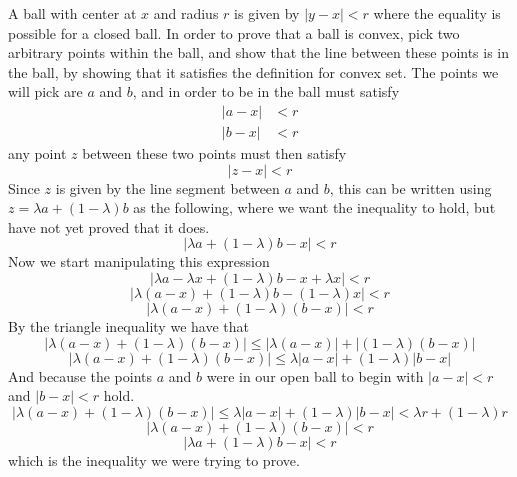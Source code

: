 \begin{proof-dan}
  A ball with center at $x$ and radius $r$ is given by $|y-x|<r$ where the equality is possible for a closed ball.
  In order to prove that a ball is convex, pick two arbitrary points within the ball, and show that the line between these points is in the ball, by showing that it satisfies the definition for convex set.
  The points we will pick are $a$ and $b$, and in order to be in the ball must satisfy
  \begin{align*}
    |a-x|&<r \\
    |b-x|&<r
  \end{align*}
  any point $z$ between these two points must then satisfy
  \begin{equation*}
    |z-x|<r
  \end{equation*}
  Since $z$ is given by the line segment between $a$ and $b$, this can be written using $z=\lambda a+(1-\lambda)b$ as the following, where we want the inequality to hold, but have not yet proved that it does.
  \begin{equation*}
    |\lambda a+(1-\lambda)b-x|<r
  \end{equation*}
  Now we start manipulating this expression
  \begin{equation*}
    |\lambda a-\lambda x+(1-\lambda)b-x+\lambda x|<r
  \end{equation*}
  \begin{equation*}
    |\lambda(a-x)+(1-\lambda)b-(1-\lambda)x|<r
  \end{equation*}
  \begin{equation*}
    |\lambda(a-x)+(1-\lambda)(b-x)|<r
  \end{equation*}
  By the triangle inequality we have that
  \begin{equation*}
    |\lambda(a-x)+(1-\lambda)(b-x)|\leq|\lambda(a-x)|+|(1-\lambda)(b-x)|
  \end{equation*}
  \begin{equation*}
    |\lambda(a-x)+(1-\lambda)(b-x)|\leq\lambda|a-x|+(1-\lambda)|b-x|
  \end{equation*}
  And because the points $a$ and $b$ were in our open ball to begin with $|a-x|<r$ and $|b-x|<r$ hold.
  \begin{equation*}
    |\lambda(a-x)+(1-\lambda)(b-x)|\leq\lambda|a-x|+(1-\lambda)|b-x|<\lambda r+(1-\lambda)r
  \end{equation*}
  \begin{equation*}
    |\lambda(a-x)+(1-\lambda)(b-x)|<r
  \end{equation*}
  \begin{equation*}
    |\lambda a+(1-\lambda)b-x|<r
  \end{equation*}
  which is the inequality we were trying to prove.
\end{proof-dan}

